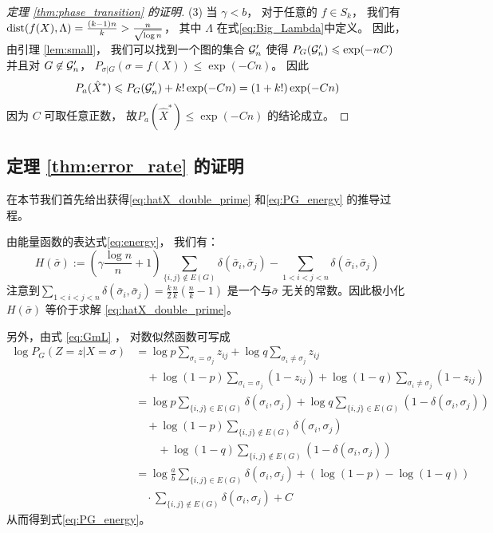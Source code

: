 \begin{proof}[定理 \ref{thm:phase_transition} 的证明]
	(3) 当 $\gamma < b$，
  对于任意的 $f\in S_k$，
  我们有
  $\operatorname{dist}(f(X), \Lambda) = \frac{(k-1)n}{k} > \frac{n}{\sqrt{\log n}}$，
  其中 $\Lambda$ 在式\eqref{eq:Big_Lambda}中定义。
	因此，由引理 \ref{lem:small}，
  我们可以找到一个图的集合 $\mathcal{G}'_n$
  使得 $P_G(\mathcal{G}'_n) \leqslant \exp(-nC)$
	并且对 $G\not \in \mathcal{G}'_n$， $P_{\sigma|G}(\sigma = f(X)) \leq \exp(-Cn)$。
  因此
	\begin{align*}
	P_a(\hat{X}^*) \leqslant P_G(\mathcal{G}'_n) + k! \exp(-Cn) = (1+k!)\exp (-Cn)
	\end{align*}
	因为 $C$
  可取任意正数，
	故$P_a \left(\hat{X}^* \right) \leq \exp(-Cn)$
  的结论成立。
\end{proof}
\subsection{定理 \ref{thm:error_rate} 的证明}
在本节我们首先给出获得\eqref{eq:hatX_double_prime}
和\eqref{eq:PG_energy} 的推导过程。

由能量函数的表达式\eqref{eq:energy}，
我们有：
\begin{equation}
	H(\bar{\sigma}) := \left(
    \gamma \frac{\log n}{n} + 1 \right)\sum_{\{i,j\}\not\in E(G)} \delta(\bar{\sigma}_i, \bar{\sigma}_j)
	- \sum_{1<i<j<n} \delta(\bar{\sigma}_i, \bar{\sigma}_j)
\end{equation}
注意到$\sum_{1<i<j<n} \delta(\bar{\sigma}_i, \bar{\sigma}_j)=\frac{k}{2}\frac{n}{k}(\frac{n}{k}-1)$
是一个与$\bar{\sigma}$ 无关的常数。因此极小化
$H(\bar{\sigma}) $ 等价于求解
\eqref{eq:hatX_double_prime}。

另外，由式 \eqref{eq:GmL} ，
对数似然函数可写成
\begin{align*}
  \log P_G(Z=z|X=\sigma)
  &= \log p \sum_{\sigma_i = \sigma_j} z_{ij}
  +\log q \sum_{\sigma_i \neq \sigma_j}z_{ij}\\
  &\quad +\log (1-p) \sum_{\sigma_i = \sigma_j}(1-z_{ij})
  +\log (1-q) \sum_{\sigma_i \neq \sigma_j}(1-z_{ij})\\
  &= \log p \sum_{\{i,j\}\in E(G)}
  \delta(\sigma_i, \sigma_j) +
  \log q \sum_{\{i,j\}\in E(G)}(1-\delta(\sigma_i, \sigma_j))\\
  &\quad+\log (1-p) \sum_{\{i,j\}\not\in E(G)}
  \delta(\sigma_i, \sigma_j)\\
  &\quad\quad
  +\log (1-q) \sum_{\{i,j\}\not\in E(G)}
  (1-\delta(\sigma_i, \sigma_j))\\
  &=\log \frac{a}{b} \sum_{\{i,j\}\in E(G)}
  \delta(\sigma_i, \sigma_j) + (\log(1-p)-\log(1-q)) \\
  &\quad\cdot
  \sum_{\{i,j\}\not \in E(G)}
  \delta(\sigma_i, \sigma_j)+ C
\end{align*}
从而得到式\eqref{eq:PG_energy}。

